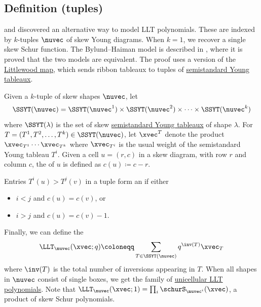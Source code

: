 \subsection[lltDefinitionTuples]{Definition (tuples)}

 and  discovered an alternative way to
model LLT polynomials.
These are indexed by $k$-tuples $\nuvec$ of skew Young diagrams. When $k=1$,
we recover a single skew Schur function.
The Bylund--Haiman model is described in \cite{HaglundHaimanLoehr2005}, where
it is proved that the two models are equivalent.
The proof uses a version of the \hyperref[littlewoodMap]{Littlewood map},
which sends ribbon tableaux to tuples of
\hyperref[prelimTableaux]{semistandard Young tableaux}.


Given a $k$-tuple of skew shapes $\nuvec$, let
\[
\SSYT(\nuvec) = \SSYT(\nuvec^1) \times \SSYT(\nuvec^2)\times \dotsm \times \SSYT(\nuvec^k)
\]
where $\SSYT(\lambda)$ is the set of skew
\hyperref[prelimTableaux]{semistandard Young tableaux} of shape $\lambda$.
For $T = (T^1,T^2,\dotsc,T^k) \in \SSYT(\nuvec)$,
let $\xvec^T$ denote the product $\xvec_{T^1}\dotsm \xvec_{T^k}$ where $\xvec_{T^i}$
is the usual weight of the semistandard Young tableau $T^i$.
Given a cell $u = (r,c)$ in a skew diagram, with row $r$ and column $c$, the
\label{skewDiagramContent} of $u$ is defined as
$c(u)\coloneqq c-r$.

Entries $T^i(u) \gt T^j(v)$ in a tuple form an
\label{lltInversion} if either
\begin{itemize}
\item $i \lt j$ and $c(u) = c(v)$, or
\item $i \gt j$ and $c(u) = c(v)-1$.
\end{itemize}
Finally, we can define the \label{lltPolynomialDefinition}
\[
\LLT_\nuvec(\xvec;q)
\coloneqq
\sum_{T \in \SSYT(\nuvec)}  q^{\inv(T)} \xvec_T
\]
where $\inv(T)$ is the total number of inversions appearing in $T$.
When all shapes in $\nuvec$ consist of single boxes,
we get the family of \hyperref[unicellularLLT]{unicellular LLT polynomials}.
Note that $\LLT_\nuvec(\xvec;1) = \prod_{i} \schurS_{\nuvec^i}(\xvec)$, a
product of skew Schur polynomials.


